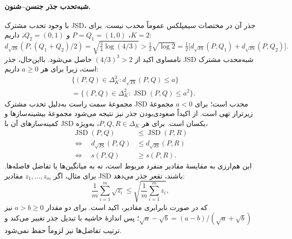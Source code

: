 \paragraph{شبه‌تحدب جذر جنسن--شنون.}
با وجود تحدب مشترک JSD، جذر آن در مختصات سیمپلکس
عموماً محدب نیست. برای $K=2$، $P=Q_1=(1,0)$
و $Q_2=(0,1)$، داریم:
\begin{equation}\label{eq:app-pd-sqrt-js-nonconvex}
d_{\sqrt{\mathrm{JS}}}(P,(Q_1+Q_2)/2)
=\sqrt{\tfrac34\log(4/3)}
>\tfrac12\sqrt{\log2}
=\tfrac12\bigl[d_{\sqrt{\mathrm{JS}}}(P,Q_1)
+d_{\sqrt{\mathrm{JS}}}(P,Q_2)\bigr].
\end{equation}
نامساوی اکید از $(4/3)^3>2$ حاصل می‌شود.
بااین‌حال، جذر JSD شبه‌محدب مشترک است، زیرا برای هر
$a\ge0$ داریم:
\begin{equation}\label{eq:app-pd-sqrt-js-quasiconvex}
\begin{aligned}
&\{(P,Q)\in\Delta_K^2:d_{\sqrt{\mathrm{JS}}}(P,Q)\le a\}\\
&=\{(P,Q)\in\Delta_K^2:\operatorname{JSD}(P,Q)\le a^2\}.
\end{aligned}
\end{equation}
مجموعهٔ سمت راست به‌دلیل تحدب مشترک JSD محدب است؛
برای $a<0$ مجموعهٔ زیرتراز تهی است.
از اکیداً صعودی‌بودن جذر نیز نتیجه می‌شود مجموعهٔ
بیشینه‌سازها و کمینه‌سازهای آن با JSD یکسان است.
برای هر $P,Q,R\in\Delta_K$، به‌ویژه،
\begin{equation}\label{eq:app-pd-js-order-equivalence}
\begin{aligned}
\operatorname{JSD}(P,Q)&\le\operatorname{JSD}(P,R)\\
\Longleftrightarrow\quad
d_{\sqrt{\mathrm{JS}}}(P,Q)&\le d_{\sqrt{\mathrm{JS}}}(P,R)\\
\Longleftrightarrow\quad s(P,Q)&\ge s(P,R).
\end{aligned}
\end{equation}
این هم‌ارزی به مقایسهٔ مقادیر منفرد مربوط است، نه
به میانگین‌ها یا تفاضل فاصله‌ها. برای مثال، اگر
$z_1,\ldots,z_m$ مقادیر JSD باشند، تقعر جذر می‌دهد:
\begin{equation}\label{eq:app-pd-js-mean-sqrt}
\frac1m\sum_{i=1}^{m}\sqrt{z_i}
\le\sqrt{\frac1m\sum_{i=1}^{m}z_i},
\end{equation}
که در صورت نابرابری مقادیر، اکید است. برای دو مقدار
$a>b\ge0$ نیز $\sqrt a-\sqrt b=(a-b)/(\sqrt a+\sqrt b)$؛
پس اندازهٔ حاشیه با تبدیل جذر تغییر می‌کند و
ترتیب تفاضل‌ها نیز لزوماً حفظ نمی‌شود.

